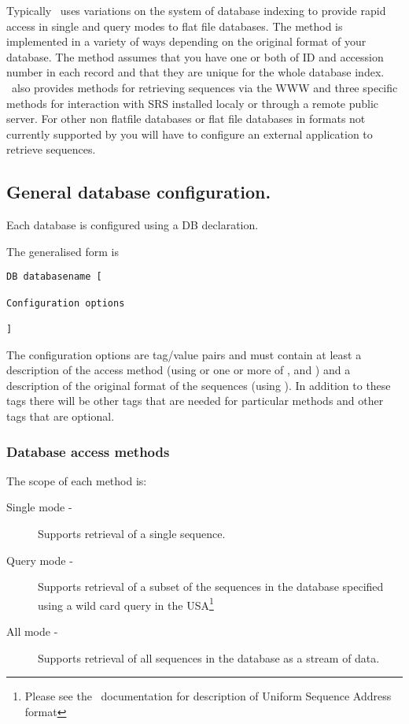 \documentclass{report}
\begin{document}
Typically \EMBOSS\ uses variations on the  system of
database indexing to provide rapid access in single and query modes to
flat file databases. The  method is implemented in a
variety of ways depending on the original format of your database.
The  method assumes that you have one or both of ID
and accession number in each record and that they are unique for the
whole database index.  \EMBOSS\ also provides methods for retrieving
sequences via the WWW and three specific methods for interaction with
SRS installed localy
or through a remote public server.  For other non flatfile databases
or flat file databases in formats not currently supported by \EMBOSS
you will have to configure an external application to retrieve
sequences.

\subsection{General database configuration.}

Each database is configured using a DB declaration.

The generalised form is 

\begin{verbatim}
DB databasename [

Configuration options

]
\end{verbatim}

The configuration options are tag/value pairs and must contain at
least a description of the access method (using  or
one or more of ,  and
) and a description of the original format of the
sequences (using ).  In addition to these tags there
will be other tags that are needed for particular methods and other
tags that are optional.

\subsubsection{Database access methods}

The scope of each method is:

\begin{description}

\item[Single mode - ] Supports retrieval of a single
sequence.

\item[Query mode - ] Supports retrieval of a subset of the
sequences in the database specified using a wild card query in the
USA\footnote{Please see the \EMBOSS\ documentation for description of
Uniform Sequence Address format}

\item[All mode - ] Supports retrieval of all sequences in
the database as a stream of data.

\end{description}
\end{document}

